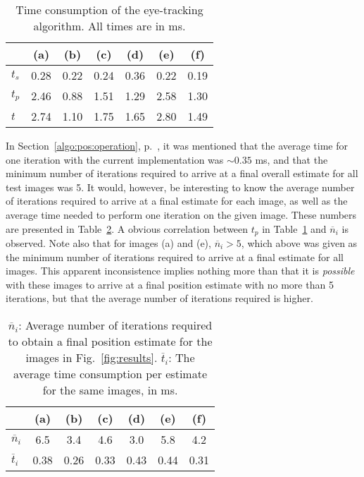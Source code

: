 \begin{table}[tb]
  \begin{center}
    \begin{tabular}{|l||c|c|c|c|c|c|}                      \hline
              & (a)  & (b)  & (c)  & (d)  & (e)  & (f)  \\ \hline\hline
      $t_{s}$ & 0.28 & 0.22 & 0.24 & 0.36 & 0.22 & 0.19 \\ \hline
      $t_{p}$ & 2.46 & 0.88 & 1.51 & 1.29 & 2.58 & 1.30 \\ \hline
      $t$     & 2.74 & 1.10 & 1.75 & 1.65 & 2.80 & 1.49 \\ \hline
    \end{tabular}
  \end{center}
  \caption{\label{tab:time}Time consumption of the {\octopus}
    eye-tracking algorithm.  All times are in ms.}
\end{table}

In Section~\ref{algo:pos:operation}, p.~\pageref{pg:iterationtime}, it
was mentioned that the average time for one iteration with the current
implementation was $\sim 0.35$ ms, and that the minimum number of
iterations required to arrive at a final overall estimate for all test
images was 5.  It would, however, be interesting to know the average
number of iterations required to arrive at a final estimate for each
image, as well as the average time needed to perform one iteration on
the given image.  These numbers are presented in
Table~\ref{tab:iterations}.  A obvious correlation between $t_{p}$ in
Table~\ref{tab:time} and $\overline{n}_{i}$ is observed.  Note also
that for images (a) and (e), $\overline{n}_{i}>5$, which above was
given as the minimum number of iterations required to arrive at a
final estimate for all images.  This apparent inconsistence implies
nothing more than that it is {\em possible\/} with these images to
arrive at a final position estimate with no more than 5 iterations,
but that the average number of iterations required is higher.

\begin{table}[tb]
  \begin{center}
    \begin{tabular}{|l||c|c|c|c|c|c|}                           \hline
                         & (a) & (b) & (c) & (d) & (e) & (f) \\ \hline\hline
      $\overline{n}_{i}$ & 6.5  & 3.4  & 4.6  & 3.0  & 5.8  & 4.2  \\ \hline
      $\overline{t}_{i}$ & 0.38 & 0.26 & 0.33 & 0.43 & 0.44 & 0.31 \\ \hline
    \end{tabular}
  \end{center}
  \caption{\label{tab:iterations}$\overline{n}_{i}$: Average number of
    iterations required to obtain a final position estimate for the
    images in Fig.~\protect\ref{fig:results}.  $\overline{t}_{i}$: The
    average time consumption per estimate for the same images, in ms.}
\end{table}

